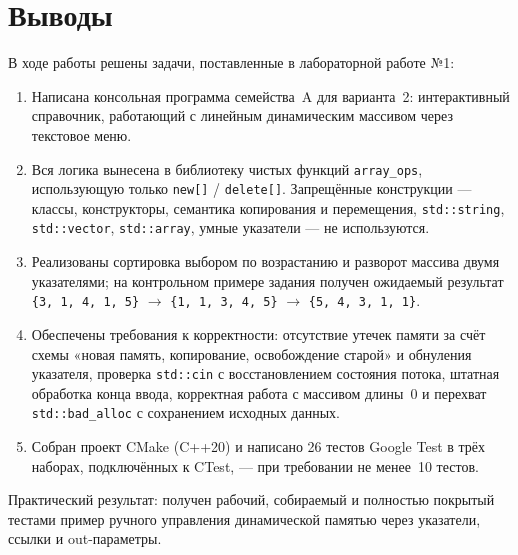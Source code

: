 \section{Выводы}

В ходе работы решены задачи, поставленные в лабораторной работе №1:

\begin{enumerate}
  \item Написана консольная программа семейства~A для варианта~2: интерактивный
        справочник, работающий с линейным динамическим массивом через текстовое
        меню.
  \item Вся логика вынесена в библиотеку чистых функций
        \texttt{array\_ops}, использующую только \texttt{new[]} /
        \texttt{delete[]}. Запрещённые конструкции --- классы, конструкторы,
        семантика копирования и перемещения, \texttt{std::string},
        \texttt{std::vector}, \texttt{std::array}, умные указатели --- не
        используются.
  \item Реализованы сортировка выбором по возрастанию и разворот массива двумя
        указателями; на контрольном примере задания получен ожидаемый
        результат \texttt{\{3, 1, 4, 1, 5\}}
        $\rightarrow$ \texttt{\{1, 1, 3, 4, 5\}}
        $\rightarrow$ \texttt{\{5, 4, 3, 1, 1\}}.
  \item Обеспечены требования к корректности: отсутствие утечек памяти за счёт
        схемы «новая память, копирование, освобождение старой» и обнуления
        указателя, проверка \texttt{std::cin} с восстановлением состояния
        потока, штатная обработка конца ввода, корректная работа с массивом
        длины~0 и перехват \texttt{std::bad\_alloc} с сохранением исходных
        данных.
  \item Собран проект CMake (C++20) и написано 26 тестов Google Test в трёх
        наборах, подключённых к CTest, --- при требовании не менее~10 тестов.
\end{enumerate}

Практический результат: получен рабочий, собираемый и полностью покрытый
тестами пример ручного управления динамической памятью через указатели,
ссылки и out-параметры.
